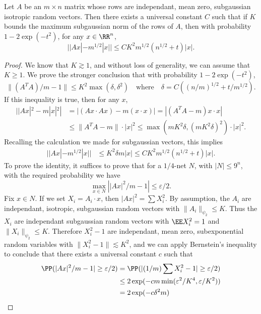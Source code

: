 \begin{theorem}
    Let $A$ be an $m \times n$ matrix whose rows are independant, mean zero, subgaussian isotropic random vectors. Then there exists a universal constant $C$ such that if $K$ bounds the maximum subgaussian norm of the rows of $A$, then with probability $1 - 2 \exp(-t^2)$, for any $x \in \RR^n$,
    \[ ||Ax| - m^{1/2}|x|| \leq C K^2 m^{1/2} (n^{1/2} + t) |x|. \]
\end{theorem}
\begin{proof}
	We know that $K \gtrsim 1$, and without loss of generality, we can assume that $K \geq 1$. We prove the stronger conclusion that with probability $1 - 2\exp(-t^2)$,
    \[ \| (A^TA)/m - 1 \| \leq K^2 \max(\delta,\delta^2)\quad\text{where}\quad \delta = C \left( (n/m)^{1/2} + t / m^{1/2} \right). \]
    If this inequality is true, then for any $x$,
    \begin{align*}
    	||Ax|^2 - m |x|^2| &= |(Ax \cdot Ax) - m (x \cdot x)| = |(A^TA - m)x \cdot x|\\
    	&\leq \| A^TA - m \| \cdot |x|^2 \leq \max(m K^2 \delta, (m K^2 \delta)^2) \cdot |x|^2.
    \end{align*}
    Recalling the calculation we made for subgaussian vectors, this implies
 	\begin{align*}
    	||Ax| - m^{1/2} |x|| &\leq K^2 \delta m |x| \leq C K^2 m^{1/2} (n^{1/2} + t) |x|.
    \end{align*}
    To prove the identity, it suffices to prove that for a $1/4$-net $N$, with $|N| \leq 9^n$, with the required probability we have
    \[ \max_{x \in N} \left| |Ax|^2/m - 1 \right| \leq \varepsilon/2. \]
    Fix $x \in N$. If we set $X_i = A_i \cdot x$, then $|Ax|^2 = \sum X_i^2$. By assumption, the $A_i$ are independant, isotropic, subgaussian random vectors with $\| A_i \|_{\psi_2} \leq K$. Thus the $X_i$ are independant subgaussian random vectors with $\EE X_i^2 = 1$ and $\| X_i \|_{\psi_2} \leq K$. Therefore $X_i^2 - 1$ are independant, mean zero, subexponential random variables with $\| X_i^2 - 1 \| \lesssim K^2$, and we can apply Bernstein's inequality to conclude that there exists a universal constant $c$ such that
    \begin{align*}
        \PP(|Ax|^2/m - 1| \geq \varepsilon/2) &= \PP(|(1/m) \sum X_i^2 - 1| \geq \varepsilon/2)\\
        &\leq 2 \exp(-c m \min(\varepsilon^2/K^4, \varepsilon/K^2))\\
        &= 2 \exp(-c \delta^2 m)\\

\end{align*}
\end{proof}
